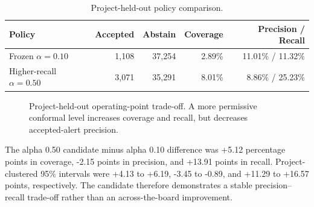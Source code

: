 \documentclass[pdflatex,sn-mathphys-num]{sn-jnl}
\begin{document}
\begin{table}[htbp]
\caption{Project-held-out policy comparison.}\label{tab:holdout}
\centering
\begin{tabular}{@{}lrrrr@{}}
\toprule
Policy & Accepted & Abstain & Coverage & Precision / Recall\\
\midrule
Frozen $\alpha=0.10$ & 1,108 & 37,254 & 2.89\% & 11.01\% / 11.32\%\\
Higher-recall $\alpha=0.50$ & 3,071 & 35,291 & 8.01\% & 8.86\% / 25.23\%\\
\bottomrule
\end{tabular}
\end{table}

\begin{figure}[htbp]
\centering
{}
\caption{Project-held-out operating-point trade-off. A more permissive conformal level increases coverage and recall, but decreases accepted-alert precision.}
\label{fig:holdout-tradeoff}
\end{figure}

The alpha 0.50 candidate minus alpha 0.10 difference was +5.12 percentage points in coverage, -2.15 points in precision, and +13.91 points in recall. Project-clustered 95\% intervals were +4.13 to +6.19, -3.45 to -0.89, and +11.29 to +16.57 points, respectively. The candidate therefore demonstrates a stable precision--recall trade-off rather than an across-the-board improvement.
\end{document}
